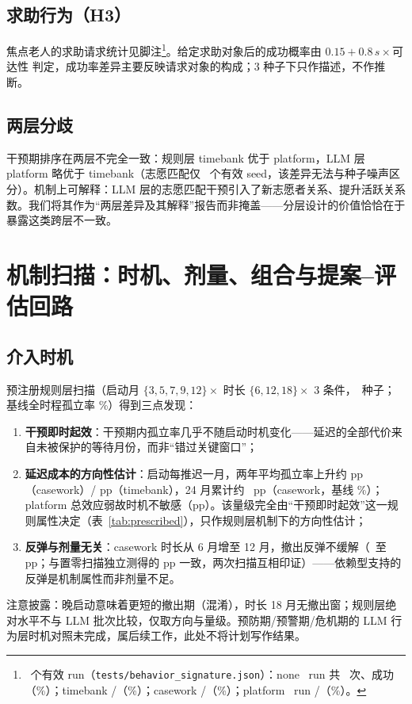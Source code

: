 \documentclass[10.5pt,twocolumn]{ctexart}
\begin{document}
\subsection{求助行为（H3）}
焦点老人的求助请求统计见脚注\footnote{\ValidRuns\ 个有效 run（\texttt{tests/behavior\_signature.json}）：none \BsNNone\ run 共 \BsReqNone\ 次、成功 \BsOkNone（\BsRateNone\%）；timebank \BsReqTb/\BsOkTb（\BsRateTb\%）；casework \BsReqCw/\BsOkCw（\BsRateCw\%）；platform \BsNPf\ run \BsReqPf/\BsOkPf（\BsRatePf\%）。}。给定求助对象后的成功概率由 $0.15+0.8\,s\times$可达性 判定，成功率差异主要反映请求对象的构成；3 种子下只作描述，不作推断。

\subsection{两层分歧}
干预期排序在两层不完全一致：规则层 timebank 优于 platform，LLM 层 platform 略优于 timebank（志愿匹配仅 \NPlatform\ 个有效 seed，该差异无法与种子噪声区分）。机制上可解释：LLM 层的志愿匹配干预引入了新志愿者关系、提升活跃关系数。我们将其作为``两层差异及其解释''报告而非掩盖——分层设计的价值恰恰在于暴露这类跨层不一致。

\section{机制扫描：时机、剂量、组合与提案--评估回路}\label{sec:mechanism}
\subsection{介入时机}
预注册规则层扫描（启动月 $\{3,5,7,9,12\}\times$ 时长 $\{6,12,18\}\times$ 3 条件，\TimingSeeds\ 种子；基线全时程孤立率 \RulesBaselineOverall\%）得到三点发现：
\begin{enumerate}
  \item \textbf{干预即时起效}：干预期内孤立率几乎不随启动时机变化——延迟的全部代价来自未被保护的等待月份，而非``错过关键窗口''；
  \item \textbf{延迟成本的方向性估计}：启动每推迟一月，两年平均孤立率上升约 \DelayCostCasework pp（casework）/ \DelayCostTimebank pp（timebank），24 月累计约 \DelayCumCasework\ pp（casework，基线 \RulesBaselineOverall\%）；platform 总效应弱故时机不敏感（\DelayCostPlatform pp）。该量级完全由``干预即时起效''这一规则属性决定（表~\ref{tab:prescribed}），只作规则层机制下的方向性估计；
  \item \textbf{反弹与剂量无关}：casework 时长从 6 月增至 12 月，撤出反弹不缓解（\RulesRebCwLo\ 至 \RulesRebCwHi pp；与置零扫描独立测得的 \PPRebCw pp 一致，两次扫描互相印证）——依赖型支持的反弹是机制属性而非剂量不足。
\end{enumerate}
注意披露：晚启动意味着更短的撤出期（混淆），时长 18 月无撤出窗；规则层绝对水平不与 LLM 批次比较，仅取方向与量级。预防期/预警期/危机期的 LLM 行为层时机对照未完成，属后续工作，此处不将计划写作结果。
\end{document}
